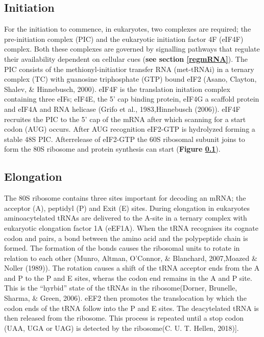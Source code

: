 \documentclass[12pt,openany]{book}
\begin{document}
\clearpage

\subsection{Initiation} \label{initiation}

For the initiation to commence, in eukaryotes, two complexes are
required; the pre-initiation complex (PIC) and the eukaryotic initiation
factor 4F (eIF4F) complex. Both these complexes are governed by
signalling pathways that regulate their availability dependent on
cellular cues (\textbf{see section \ref{regmRNA}}). The PIC consists of
the methionyl-initiatior transfer RNA (met-tRNAi) in a ternary complex
(TC) with guanosine triphosphate (GTP) bound eIF2 (Asano, Clayton,
Shalev, \& Hinnebusch, 2000). eIF4F is the translation initation complex
containing three eIFs; eIF4E, the 5' cap binding protein, eIF4G a
scaffold protein and eIF4A and RNA helicase (Grifo et al.,
1983,Hinnebusch (2006)). eIF4F recruites the PIC to the 5' cap of the
mRNA after which scanning for a start codon (AUG) occurs. After AUG
recognition eIF2-GTP is hydrolyzed forming a stable 48S PIC.
Afterrelease of eIF2-GTP the 60S ribosomal subunit joins to form the 80S
ribosome and protein synthesis can start (\textbf{Figure
\ref{initiation}}).

\subsection{Elongation}

The 80S ribosome contains three sites important for decoding an mRNA;
the acceptor (A), peptidyl (P) and Exit (E) sites. During elongation in
eukaryotes aminoacytelated tRNAs are delivered to the A-site in a
ternary complex with eukaryotic elongation factor 1A (eEF1A). When the
tRNA recognises its cognate codon and pairs, a bond between the amino
acid and the polypeptide chain is formed. The formation of the bonds
causes the ribosomal units to rotate in relation to each other (Munro,
Altman, O'Connor, \& Blanchard, 2007,Moazed \& Noller (1989)). The
rotation causes a shift of the tRNA acceptor ends from the A and P to
the P and E sites, wheras the codon end remains in the A and P site.
This is the ``hyrbid'' state of the tRNAs in the ribosome(Dorner,
Brunelle, Sharma, \& Green, 2006). eEF2 then promotes the translocation
by which the codon ends of the tRNA follow into the P and E sites. The
deacytelated tRNA is then released from the ribosome. This process is
repeated until a stop codon (UAA, UGA or UAG) is detected by the
ribosome(C. U. T. Hellen, 2018){]}.
\end{document}
